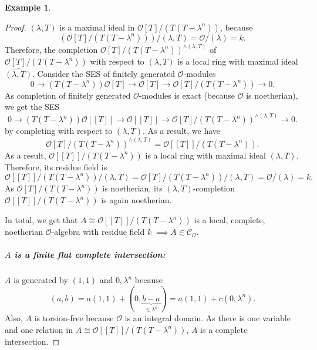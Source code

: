 \documentclass{article}
\theoremstyle{plain}%
\theoremstyle{definition}
\newtheorem{example}{Example}[section]
\theoremstyle{remark}
\newcommand{\co}{\mathcal{C}_\mathcal{O}}
\begin{document}
\begin{example}
\begin{proof}
            \((\lambda, T)\) is a maximal ideal in \(\mathcal{O}[T]/(T(T-\lambda^n))\), because
            \[\left(\mathcal{O}[T]/(T(T-\lambda^n))\right)/(\lambda, T) = \mathcal{O}/(\lambda) = k.\]
            Therefore, the completion \(\mathcal{O}[T]/(T(T-\lambda^n))^{\wedge(\lambda, T)}\) 
            of \(\mathcal{O}[T]/(T(T-\lambda^n))\) with respect to \((\lambda, T)\) is a local ring with maximal ideal
            \(\widehat{(\lambda, T)}\).
            Consider the SES of finitely generated \(\mathcal{O}\)-modules
            \[
                0 \to (T(T - \lambda^n)) \mathcal{O}[T] \to \mathcal{O}[T] \to \mathcal{O}[T]/(T(T-\lambda^n)) \to 0.
            \]
            As completion of finitely generated \(\mathcal{O}\)-modules is exact (because \(\mathcal{O}\) is noetherian), we get the SES
            \[
                0 \to (T(T-\lambda^n))\mathcal{O}[[T]] \to \mathcal{O}[[T]] \to \mathcal{O}[T]/(T(T-\lambda^n))^{\wedge (\lambda, T)}  \to 0.
            \]
            by completing with respect to \((\lambda, T)\).
            As a result, we have
            \[
                \mathcal{O}[T]/(T(T-\lambda^n))^{\wedge (\lambda, T)} = \mathcal{O}[[T]]/(T(T-\lambda^n)).
            \]
            As a result, \(\mathcal{O}[[T]]/(T(T-\lambda^n))\) is a local ring with maximal ideal \((\lambda, T)\).
            Therefore, its residue field is
            \[
                \mathcal{O}[[T]]/(T(T-\lambda^n))/(\lambda, T) = \mathcal{O}[T]/(T(T-\lambda^n))/(\lambda, T) = \mathcal{O}/(\lambda) = k.
            \]
            As \(\mathcal{O}[T]/(T(T-\lambda^n))\) is noetherian, its \((\lambda, T)\)-completion \(\mathcal{O}[[T]]/(T(T-\lambda^n))\)
            is again noetherian.

            In total, we get that \(A \cong \mathcal{O}[[T]]/(T(T-\lambda^n))\) is a local, complete, noetherian \(\mathcal{O}\)-algebra 
            with residue field \(k\; \implies A \in \co\). 
            \subparagraph{\(A\) is a finite flat complete intersection:}
            \(A\) is generated by \((1,1)\) and \(0, \lambda^n\) because
            \[
                (a,b) = a(1,1) + (0, \underbrace{b-a}_{\in \lambda^n}) = a(1,1) + c(0, \lambda^n).
            \]
            Also, \(A\) is torsion-free because \(\mathcal{O}\) is an integral domain. 
            As there is one variable and one relation in \(A \cong \mathcal{O}[[T]]/(T(T-\lambda^n))\), \(A\) is a complete intersection.
        \end{proof}
    \end{example}
\end{document}
